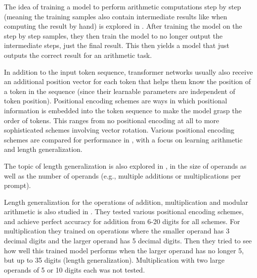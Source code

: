 The idea of training a model to perform arithmetic computations step by step (meaning the training samples also contain intermediate results like when computing the result by hand) is explored in \cite{implicit}. After training the model on the step by step samples, they then train the model to no longer output the intermediate steps, just the final result. This then yields a model that just outputs the correct result for an arithmetic task.

In addition to the input token sequence, transformer networks usually also receive an additional position vector for each token that helps them know the position of a token in the sequence (since their learnable parameters are independent of token position).
Positional encoding schemes are ways in which positional information is embedded into the token sequence to make the model grasp the order of tokens. This ranges from no positional encoding at all to more sophisticated schemes involving vector rotation.
Various positional encoding schemes are compared for performance in  \cite{positionmatters}, with a focus on learning arithmetic and length generalization. 

The topic of length generalization is also explored in \cite{lengthandcount},  in the size of operands as well as the number of operands (e.g., multiple additions or multiplications per prompt).

Length generalization for the operations of addition, multiplication and modular arithmetic is also studied in \cite{lengthgen}. They tested various positional encoding schemes, and achieve perfect accuracy for addition from 6-20 digits for all schemes. For multiplication they trained on operations where the smaller operand has 3 decimal digits and the larger operand has 5 decimal digits. Then they tried to see how well this trained model performs when the larger operand has no longer 5, but up to 35 digits (length generalization). Multiplication with two large operands of 5 or 10 digits each was not tested.
